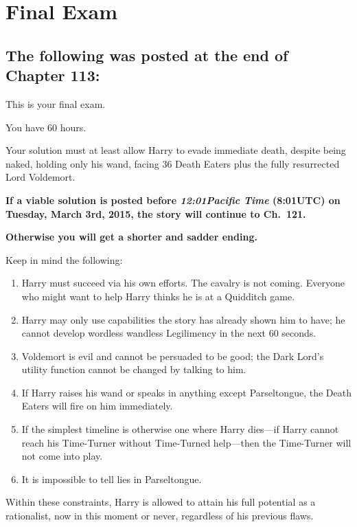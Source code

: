 \chapter{Final Exam}

\section{The following was posted at the end of Chapter 113:}

{\setlength{\parindent}{0pt}
\setlength{\parskip}{.5\baselineskip}

This is your final exam.

You have 60 hours.

Your solution must at least allow Harry to evade immediate death,
despite being naked, holding only his wand, facing 36 Death Eaters
plus the fully resurrected Lord Voldemort.

\textbf{If a viable solution is posted before \emph{12:01\AM Pacific Time} (8:01\AM UTC) on Tuesday, March 3rd, 2015, the story will continue to Ch.~121.}

\textbf{Otherwise you will get a shorter and sadder ending.}

Keep in mind the following:
\begin{enumerate}
\item Harry must succeed via his own efforts. The cavalry is not coming.
Everyone who might want to help Harry thinks he is at a Quidditch game.
\item Harry may only use capabilities the story has already shown him to
have; he cannot develop wordless wandless Legilimency in the next 60 seconds.
\item Voldemort is evil and cannot be persuaded to be good; the Dark Lord’s utility function cannot be changed by talking to him.
\item If Harry raises his wand or speaks in anything except Parseltongue, the Death Eaters will fire on him immediately.
\item If the simplest timeline is otherwise one where Harry dies—if Harry cannot reach his Time-Turner without Time-Turned help—then the Time-Turner will not come into play.
\item It is impossible to tell lies in Parseltongue.
\end{enumerate}
{\setlength{\parindent}{0pt}
\setlength{\parskip}{.5\baselineskip}
Within these constraints, Harry is allowed to attain his full potential as a rationalist, now in this moment or never, regardless of his previous flaws.

}}
